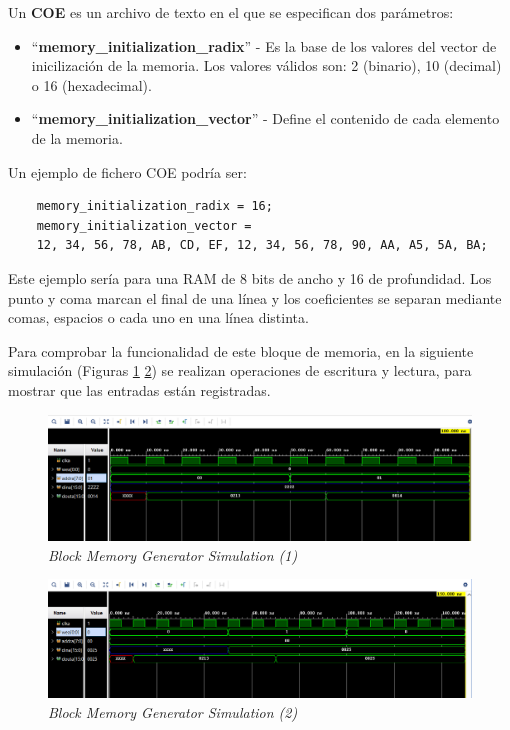Un \textbf{COE} es un archivo de texto en el que se especifican dos parámetros:

\begin{itemize}
    \item ``\textbf{memory\_initialization\_radix}'' - Es la base de los valores del vector de inicilización de la memoria. Los valores válidos son: 
    2 (binario), 10 (decimal) o 16 (hexadecimal).
    \item ``\textbf{memory\_initialization\_vector}'' - Define el contenido de cada elemento de la memoria.
\end{itemize}

Un ejemplo de fichero COE podría ser:

\begin{lstlisting}
    memory_initialization_radix = 16;
    memory_initialization_vector =
    12, 34, 56, 78, AB, CD, EF, 12, 34, 56, 78, 90, AA, A5, 5A, BA;
\end{lstlisting}

Este ejemplo sería para una RAM de 8 bits de ancho y 16 de profundidad. Los punto y coma marcan el final de una línea y los coeficientes 
se separan mediante comas, espacios o cada uno en una línea distinta.

Para comprobar la funcionalidad de este bloque de memoria, en la siguiente simulación (Figuras \ref{blockmemory} \ref{blockmemory1}) se realizan operaciones de escritura y lectura, para 
mostrar que las entradas están registradas.

\begin{figure}[H]
    \centering
    \includegraphics[width = 1\textwidth]{imagenes/memoria.png}
    \caption{\textit{Block Memory Generator Simulation (1)}}\label{blockmemory}
\end{figure}

\begin{figure}[H]
    \centering
    \includegraphics[width = 1\textwidth]{imagenes/memoria1.png}
    \caption{\textit{Block Memory Generator Simulation (2)}}\label{blockmemory1}
\end{figure}

